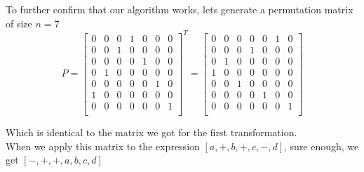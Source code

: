 \documentclass[./Research.tex]{subfiles}
\begin{document}
	To further confirm that our algorithm works, lets generate a permutation matrix of size $n = 7$
		\[ P =
		\begin{bmatrix}
    		0 & 0 & 0 & 1 & 0 & 0 & 0 \\
    		0 & 0 & 1 & 0 & 0 & 0 & 0 \\
    		0 & 0 & 0 & 0 & 1 & 0 & 0 \\
    		0 & 1 & 0 & 0 & 0 & 0 & 0 \\
    		0 & 0 & 0 & 0 & 0 & 1 & 0 \\
    		1 & 0 & 0 & 0 & 0 & 0 & 0 \\
    		0 & 0 & 0 & 0 & 0 & 0 & 1 \\
		\end{bmatrix}^{\!T}
			=
		\begin{bmatrix}
    		0 & 0 & 0 & 0 & 0 & 1 & 0 \\
    		0 & 0 & 0 & 1 & 0 & 0 & 0 \\
    		0 & 1 & 0 & 0 & 0 & 0 & 0 \\
    		1 & 0 & 0 & 0 & 0 & 0 & 0 \\
    		0 & 0 & 1 & 0 & 0 & 0 & 0 \\
    		0 & 0 & 0 & 0 & 1 & 0 & 0 \\
    		0 & 0 & 0 & 0 & 0 & 0 & 1 \\
		\end{bmatrix}\]	

	Which is identical to the matrix we got for the first transformation. \\
	
	When we apply this matrix to the expression $[a, +, b, +, c, -, d]$, sure enough, we get $[-, +, +, a, b, c, d]$
\end{document}

